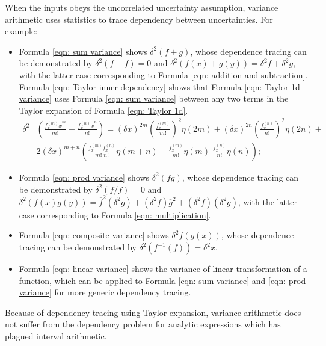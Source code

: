 \documentclass[twoside]{article}
\numberwithin{equation}{section}
\begin{document}
When the inputs obeys the uncorrelated uncertainty assumption, variance arithmetic uses statistics to trace dependency between uncertainties.
For example:
\begin{itemize}
\item Formula \eqref{eqn: sum variance} shows $\delta^2 (f + g)$, whose dependence tracing can be demonstrated by $\delta^2 (f - f) = 0$  and $\delta^2 (f(x) + g(y)) = \delta^2 f + \delta^2 g$, with the latter case corresponding to Formula \eqref{eqn: addition and subtraction}.   
Formula \eqref{eqn: Taylor inner dependency} shows that Formula \eqref{eqn: Taylor 1d variance} uses Formula \eqref{eqn: sum variance} between any two terms in the Taylor expansion of Formula \eqref{eqn: Taylor 1d}.
\begin{align}
\label{eqn: Taylor inner dependency}
\delta^2 & \left( \frac{f^{(m)}_x \tilde{x}^m}{m!} + \frac{f^{(n)}_x \tilde{x}^n}{n!} \right) = 
    (\delta x)^{2m} (\frac{f^{(m)}_x }{m!})^2 \eta(2m) + (\delta x)^{2n} (\frac{f^{(n)}_x }{n!})^2 \eta(2n) + \nonumber \\
  & 2 (\delta x)^{m+n} \left( \frac{f^{(m)}_x f^{(n)}_x}{m! \;n!} \eta(m+n) 	- \frac{f^{(m)}_x}{m!} \eta(m) \;\frac{f^{(n)}_x}{n!}  \eta(n) \right);
\end{align}

\item Formula \eqref{eqn: prod variance} shows  $\delta^2 (f g)$, whose dependence tracing can be demonstrated by $\delta^2 (f/f) = 0$  and $\delta^2 (f(x) g(y)) = \overline{f}^2 (\delta^2 g) + (\delta^2 f) \overline{g}^2 +  (\delta^2 f) (\delta^2 g)$, with the latter case corresponding to Formula \eqref{eqn: multiplication}.  

\item Formula \eqref{eqn: composite variance} shows  $\delta^2 f(g(x))$, whose dependence tracing can be demonstrated by $\delta^2 (f^{-1}(f)) = \delta^2 x$.  

\item Formula \eqref{eqn: linear variance} shows the variance of linear transformation of a function, which can be applied to Formula \eqref{eqn: sum variance} and \eqref{eqn: prod variance} for more generic dependency tracing.
\end{itemize}
Because of dependency tracing using Taylor expansion, variance arithmetic does not suffer from the dependency problem for analytic expressions \cite{Interval_Arithmetic} which has plagued interval arithmetic.
\end{document}
